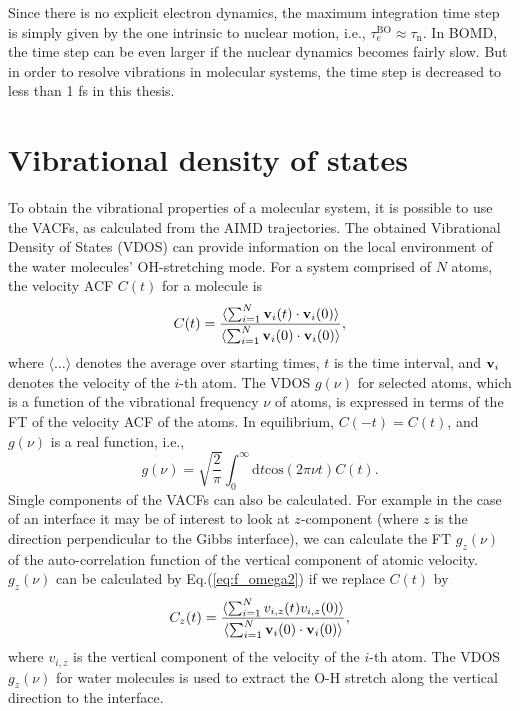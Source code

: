 Since there is no explicit electron dynamics, the maximum integration time step is simply given by the one intrinsic 
to nuclear motion, i.e., $\tau_{e}^{\text{BO}}\approx\tau_{\text{n}}$. 
In BOMD, the time step can be even larger if the nuclear dynamics becomes fairly slow\cite{GK93}. 
But in order to resolve vibrations in molecular systems, the time step is decreased to less than 1 fs in this thesis\cite{DM00}.
%
\section{Vibrational density of states}\label{section_VDOS}
To obtain the vibrational properties of a molecular system, it is possible to use the VACFs,
as calculated from the AIMD trajectories.
The obtained Vibrational Density of States (VDOS) can 
provide information on the local environment of the water molecules' OH-stretching mode. 
For a system comprised of $N$ atoms, the velocity ACF $C(t)$ for a molecule is\cite{MTD,Dickey1969,Ishiyama2007} 
\begin{equation}
C(t)=\frac{\langle\sum^{N}_{i=1}{\bf{v}}_i(t)\cdot{\bf{v}}_i(0)\rangle}{\langle\sum^{N}_{i=1}{\bf{v}}_i(0)\cdot{\bf{v}}_i(0)\rangle},
\label{eq:Ct3s}
\end{equation}
where $\langle\dots\rangle$ denotes the average over starting times, $t$ is the time interval, and ${\bf{v}}_i$ denotes 
the velocity of the $i$-th atom. The VDOS $g(\nu)$ for selected atoms, which is a function of the vibrational frequency $\nu$ 
of atoms, is expressed in terms of the FT of the velocity ACF of the atoms\cite{Allen1986}.
In equilibrium, $C(-t)=C(t)$, and $g(\nu)$ is a real function, i.e., 
\begin{equation}
g(\nu)= \sqrt{\frac{2}{\pi}}\int^{\infty}_{0}\text{d}t \text{cos}(2\pi\nu{t})C(t).
\label{eq:f_omega2}
\end{equation}
Single components of the VACFs can also be calculated. For example in the case of an interface it may be of interest to look at 
$z$-component (where $z$ is the direction perpendicular to the Gibbs interface),
we can calculate the FT $g_z(\nu)$ of the auto-correlation function of the vertical component of atomic velocity. 
$g_z(\nu)$ can be calculated by Eq.\thinspace(\ref{eq:f_omega2}) if we replace $C(t)$ by 
\begin{equation}
C_z(t)=\frac{\langle\sum^{N}_{i=1}{v_{i,z}(t){v_{i,z}(0)\rangle}}}{\langle\sum^{N}_{i=1}{\bf{v}}_i(0)\cdot{\bf{v}}_i(0)\rangle},
\label{eq:ACN}
\end{equation}
where $v_{i,z}$ is the vertical component of the velocity of the $i$-th atom.
The VDOS $g_z(\nu)$ for water molecules is used to extract the O-H stretch along the vertical direction to the interface. 

